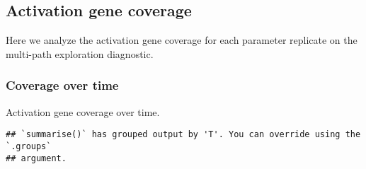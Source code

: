 \documentclass[]{book}
\newenvironment{Shaded}{\begin{snugshade}}{\end{snugshade}}
\newcommand{\DataTypeTok}[1]{\textcolor[rgb]{0.13,0.29,0.53}{#1}}
\newcommand{\KeywordTok}[1]{\textcolor[rgb]{0.13,0.29,0.53}{\textbf{#1}}}
\newcommand{\NormalTok}[1]{#1}
\newcommand{\OperatorTok}[1]{\textcolor[rgb]{0.81,0.36,0.00}{\textbf{#1}}}
\newcommand{\StringTok}[1]{\textcolor[rgb]{0.31,0.60,0.02}{#1}}
\begin{document}
\hypertarget{activation-gene-coverage-5}{%
\subsection{Activation gene coverage}\label{activation-gene-coverage-5}}

Here we analyze the activation gene coverage for each parameter replicate on the multi-path exploration diagnostic.

\hypertarget{coverage-over-time-7}{%
\subsubsection{Coverage over time}\label{coverage-over-time-7}}

Activation gene coverage over time.

\begin{Shaded}
\end{Shaded}

\begin{verbatim}
## `summarise()` has grouped output by 'T'. You can override using the `.groups`
## argument.
\end{verbatim}
\end{document}
